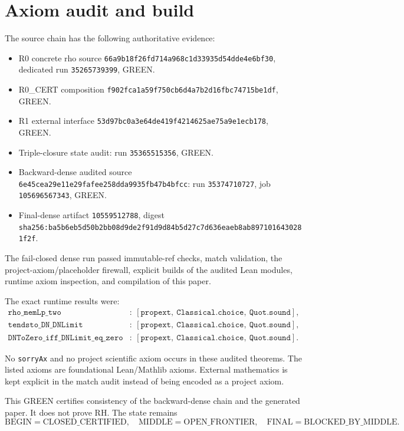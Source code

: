 \section{Axiom audit and build}
The source chain has the following authoritative evidence:
\begin{itemize}
\item R0 concrete rho source \texttt{66a9b18f26fd714a968c1d33935d54dde4e6bf30}, dedicated run \texttt{35265739399}, GREEN.
\item R0\_CERT composition \texttt{f902fca1a59f750cb6d4a7b2d16fbc74715be1df}, GREEN.
\item R1 external interface \texttt{53d97bc0a3e64de419f4214625ae75a9e1ecb178}, GREEN.
\item Triple-closure state audit: run \texttt{35365515356}, GREEN.
\item Backward-dense audited source \texttt{6e45cea29e11e29fafee258dda9935fb47b4bfcc}: run \texttt{35374710727}, job \texttt{105696567343}, GREEN.
\item Final-dense artifact \texttt{10559512788}, digest \texttt{sha256:ba5b6eb5d50b2bb08d9de2f91d9d84b5d27c7d636eaeb8ab8971016430281f2f}.
\end{itemize}

The fail-closed dense run passed immutable-ref checks, match validation, the project-axiom/placeholder firewall, explicit builds of the audited Lean modules, runtime axiom inspection, and compilation of this paper.

The exact runtime results were:
\begin{align*}
\texttt{rho\_memLp\_two} &:\ [\texttt{propext},\ \texttt{Classical.choice},\ \texttt{Quot.sound}],\\
\texttt{tendsto\_DN\_DNLimit} &:\ [\texttt{propext},\ \texttt{Classical.choice},\ \texttt{Quot.sound}],\\
\texttt{DNToZero\_iff\_DNLimit\_eq\_zero} &:\ [\texttt{propext},\ \texttt{Classical.choice},\ \texttt{Quot.sound}].
\end{align*}

No \texttt{sorryAx} and no project scientific axiom occurs in these audited theorems. The listed axioms are foundational Lean/Mathlib axioms. External mathematics is kept explicit in the match audit instead of being encoded as a project axiom.

This GREEN certifies consistency of the backward-dense chain and the generated paper. It does not prove RH. The state remains
\[
\mathrm{BEGIN=CLOSED\_CERTIFIED},\quad
\mathrm{MIDDLE=OPEN\_FRONTIER},\quad
\mathrm{FINAL=BLOCKED\_BY\_MIDDLE}.
\]